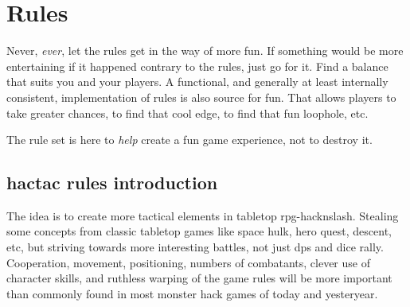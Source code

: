 


%





%
%


\cleardoublepage



\chapter*{Rules}

Never, \emph{ever}, let the rules get in the way of more fun. If something would be more entertaining if it happened contrary to the rules, just go for it. Find a balance that suits you and your players. A functional, and generally at least internally consistent, implementation of rules is also source for fun. That allows players to take greater chances, to find that cool edge, to find that fun loophole, etc.

The rule set is here to \emph{help} create a fun game experience, not to destroy it.


\section*{hactac rules introduction}

The idea is to create more tactical elements in tabletop rpg-hacknslash. Stealing some concepts from classic tabletop games like space hulk, hero quest, descent, etc, but striving towards more interesting battles, not just dps and dice rally.
Cooperation, movement, positioning, numbers of combatants, clever use of character skills, and ruthless warping of the game rules will be more important than commonly found in most monster hack games of today and yesteryear.


